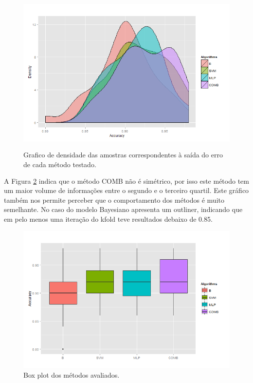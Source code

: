 \documentclass[12pt]{article}
\begin{document}
\begin{figure}[h]
\centering
\includegraphics[width=4.5in]{../out/density-graph.png} \\
\caption{Grafico de densidade das amostras correspondentes à saída do erro de cada método testado.}
\label{fig:densidade_acc}
\end{figure} 

A Figura \ref{fig:boxplot_acc} indica que o método COMB não é simétrico, por isso este método tem um maior volume de informações entre o segundo e o terceiro quartil. Este gráfico também nos permite perceber que o comportamento dos métodos é muito semelhante. No caso do modelo Bayesiano apresenta um outliner, indicando que em pelo menos uma iteração do kfold teve resultados debaixo de 0.85.

\begin{figure}[!h]
\centering
\includegraphics[width=4.5in]{../out/boxplot-errors.png}
\caption{Box plot dos métodos avaliados.}
\label{fig:boxplot_acc}
\end{figure}  


\end{document}
